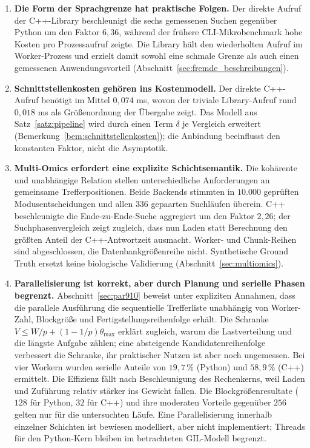 \documentclass[a4paper,12pt, twoside]{report}
\theoremstyle{definition}
\begin{document}
\begin{enumerate}
	\item \textbf{Die Form der Sprachgrenze hat praktische Folgen.} Der direkte Aufruf der C++-Library beschleunigt die sechs gemessenen Suchen gegenüber Python um den Faktor $6{,}36$, während der frühere CLI-Mikrobenchmark hohe Kosten pro Prozessaufruf zeigte. Die Library hält den wiederholten Aufruf im Worker-Prozess und erzielt damit sowohl eine schmale Grenze als auch einen gemessenen Anwendungsvorteil (Abschnitt~\ref{sec:fremde_beschreibungen}).
	\item \textbf{Schnittstellenkosten gehören ins Kostenmodell.} Der direkte C++-Aufruf benötigt im Mittel $0{,}074$ ms, wovon der triviale Library-Aufruf rund $0{,}018$ ms als Größenordnung der Übergabe zeigt. Das Modell aus Satz~\ref{satz:pipeline} wird durch einen Term $\delta$ je Vergleich erweitert (Bemerkung~\ref{bem:schnittstellenkosten}); die Anbindung beeinflusst den konstanten Faktor, nicht die Asymptotik.
	\item \textbf{Multi-Omics erfordert eine explizite Schichtsemantik.} Die kohärente und unabhängige Relation stellen unterschiedliche Anforderungen an gemeinsame Trefferpositionen. Beide Backends stimmten in $10.000$ geprüften Modusentscheidungen und allen $336$ gepaarten Suchläufen überein. C++ beschleunigte die Ende-zu-Ende-Suche aggregiert um den Faktor $2{,}26$; der Suchphasenvergleich zeigt zugleich, dass nun Laden statt Berechnung den größten Anteil der C++-Antwortzeit ausmacht. Worker- und Chunk-Reihen sind abgeschlossen, die Datenbankgrößenreihe nicht. Synthetische Ground Truth ersetzt keine biologische Validierung (Abschnitt~\ref{sec:multiomics}).
	\item \textbf{Parallelisierung ist korrekt, aber durch Planung und serielle Phasen begrenzt.} Abschnitt~\ref{sec:par910} beweist unter expliziten Annahmen, dass die parallele Ausführung die sequentielle Trefferliste unabhängig von Worker-Zahl, Blockgröße und Fertigstellungsreihenfolge erhält. Die Schranke $V\le W/p+(1-1/p)\theta_{\max}$ erklärt zugleich, warum die Lastverteilung und die längste Aufgabe zählen; eine absteigende Kandidatenreihenfolge verbessert die Schranke, ihr praktischer Nutzen ist aber noch ungemessen. Bei vier Workern wurden serielle Anteile von $19{,}7\,\%$ (Python) und $58{,}9\,\%$ (C++) ermittelt. Die Effizienz fällt nach Beschleunigung des Rechenkerns, weil Laden und Zuführung relativ stärker ins Gewicht fallen. Die Blockgrößenresultate ($128$ für Python, $32$ für C++) und ihre moderaten Vorteile gegenüber $256$ gelten nur für die untersuchten Läufe. Eine Parallelisierung innerhalb einzelner Schichten ist bewiesen modelliert, aber nicht implementiert; Threads für den Python-Kern bleiben im betrachteten GIL-Modell begrenzt.

\end{enumerate}
\end{document}

